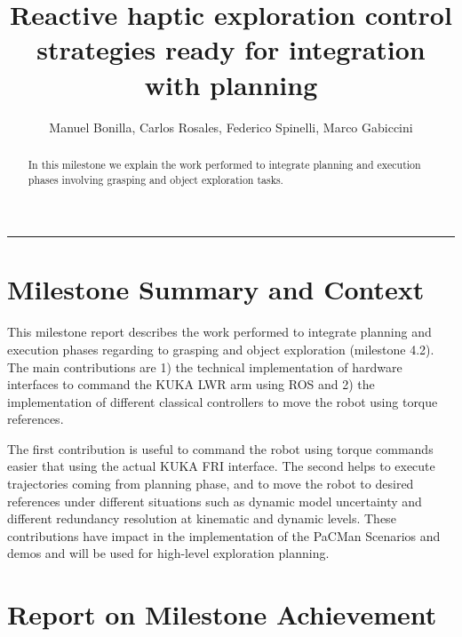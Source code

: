 \documentclass[a4paper,11pt,pdf]{pacmanreport}
\title{Reactive haptic exploration control strategies ready for integration with planning}
\author{Manuel Bonilla, Carlos Rosales, Federico Spinelli, Marco Gabiccini}
\begin{document}
\maketitle

\begin{abstract}
\noindent In this milestone we explain the work performed to integrate planning and execution phases involving grasping and object exploration tasks. 
\end{abstract}


\vspace{.2em}
\hrule

\vspace{.2em}
\footnotesize

\tableofcontents

\normalsize

\newpage

\section{Milestone Summary and Context}

This milestone report describes the work performed to integrate planning and execution phases regarding to grasping and object exploration (milestone 4.2). The main contributions are 1) the technical implementation of hardware interfaces to command the KUKA LWR arm using ROS and 2)  the implementation of different classical controllers to move the robot using torque references.

The first contribution is useful to command the robot using torque commands easier that using the actual KUKA FRI interface. The second helps to execute trajectories coming from planning phase, and to move the robot to desired references under different situations such as dynamic model uncertainty and different redundancy resolution at kinematic and dynamic levels. These contributions have impact in the implementation of the PaCMan Scenarios and demos and will be used for high-level exploration planning.




\section{Report on Milestone Achievement}
\end{document}
